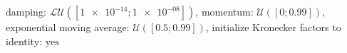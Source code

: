 damping: $\mathcal{LU}([\num[scientific-notation=true]{1e-14}; \num[scientific-notation=true]{1e-08}])$, momentum: $\mathcal{U}([\num[scientific-notation=false]{0}; \num[scientific-notation=true]{0.99}])$, exponential moving average: $\mathcal{U}([\num[scientific-notation=true]{0.5}; \num[scientific-notation=true]{0.99}])$, initialize Kronecker factors to identity: $\text{yes}$